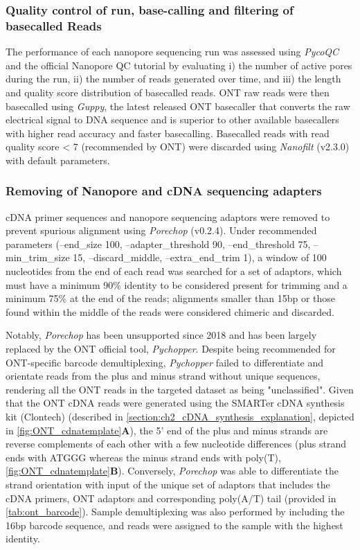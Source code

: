 \clearpage
\subsubsection{Quality control of run, base-calling and filtering of basecalled Reads}
The performance of each nanopore sequencing run was assessed using \textit{PycoQC}\cite{Leger2019} and the official Nanopore QC tutorial\cite{ONT2019NanoporeQC} by evaluating i) the number of active pores during the run, ii) the number of reads generated over time, and iii) the length and quality score distribution of basecalled reads. ONT raw reads were then basecalled using \textit{Guppy}, the latest released ONT basecaller that converts the raw electrical signal to DNA sequence and is superior to other available basecallers with higher read accuracy and faster basecalling\cite{Wick2019}. Basecalled reads with read quality score < 7 (recommended by ONT) were discarded using \textit{Nanofilt}\cite{DeCoster2018} (v2.3.0) with default parameters.

\subsubsection{Removing of Nanopore and cDNA sequencing adapters}
cDNA primer sequences and nanopore sequencing adaptors were removed to prevent spurious alignment using \textit{Porechop}\cite{Wick2017} (v0.2.4). Under recommended parameters (--end\_size 100, --adapter\_threshold 90, --end\_threshold 75, --min\_trim\_size 15, --discard\_middle, --extra\_end\_trim 1), a window of 100 nucleotides from the end of each read was searched for a set of adaptors, which must have a minimum 90\% identity to be considered present for trimming and a minimum 75\% at the end of the reads; alignments smaller than 15bp or those found within the middle of the reads were considered chimeric and discarded. 

Notably, \textit{Porechop} has been unsupported since 2018 and has been largely replaced by the ONT official tool, \textit{Pychopper}\cite{OxfordNanoporePychopper}. Despite being recommended for ONT-specific barcode demultiplexing, \textit{Pychopper} failed to differentiate and orientate reads from the plus and minus strand without unique sequences, rendering all the ONT reads in the targeted dataset as being "unclassified". Given that the ONT cDNA reads were generated using the SMARTer cDNA synthesis kit (Clontech) (described in \cref{section:ch2_cDNA_synthesis_explanation}, depicted in \cref{fig:ONT_cdnatemplate}\textbf{A}), the 5’ end of the plus and minus strands are reverse complements of each other with a few nucleotide differences (plus strand ends with ATGGG whereas the minus strand ends with poly(T), \cref{fig:ONT_cdnatemplate}\textbf{B}). Conversely, \textit{Porechop} was able to differentiate the strand orientation with input of the unique set of adaptors that includes the cDNA primers, ONT adaptors and corresponding poly(A/T) tail (provided in \cref{tab:ont_barcode}). Sample demultiplexing was also performed by including the 16bp barcode sequence, and reads were assigned to the sample with the highest identity. 

